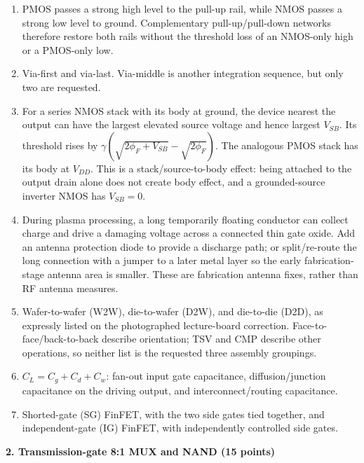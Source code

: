 \documentclass[10pt]{article}
\begin{document}
\begin{enumerate}[label=(\alph*),leftmargin=7mm,itemsep=6pt]
\item PMOS passes a strong high level to the pull-up rail, while NMOS passes a strong low level to ground. Complementary pull-up/pull-down networks therefore restore both rails without the threshold loss of an NMOS-only high or a PMOS-only low.
\item Via-first and via-last. Via-middle is another integration sequence, but only two are requested.
\item For a series NMOS stack with its body at ground, the device nearest the output can have the largest elevated source voltage and hence largest $V_{SB}$. Its threshold rises by $\gamma(\sqrt{2\phi_F+V_{SB}}-\sqrt{2\phi_F})$. The analogous PMOS stack has its body at $V_{DD}$. This is a stack/source-to-body effect: being attached to the output drain alone does not create body effect, and a grounded-source inverter NMOS has $V_{SB}=0$.
\item During plasma processing, a long temporarily floating conductor can collect charge and drive a damaging voltage across a connected thin gate oxide. Add an antenna protection diode to provide a discharge path; or split/re-route the long connection with a jumper to a later metal layer so the early fabrication-stage antenna area is smaller. These are fabrication antenna fixes, rather than RF antenna measures.
\item Wafer-to-wafer (W2W), die-to-wafer (D2W), and die-to-die (D2D), as expressly listed on the photographed lecture-board correction. Face-to-face/back-to-back describe orientation; TSV and CMP describe other operations, so neither list is the requested three assembly groupings.
\item $C_L=C_g+C_d+C_w$: fan-out input gate capacitance, diffusion/junction capacitance on the driving output, and interconnect/routing capacitance.
\item Shorted-gate (SG) FinFET, with the two side gates tied together, and independent-gate (IG) FinFET, with independently controlled side gates.
\end{enumerate}
\newpage
\textbf{2. Transmission-gate 8:1 MUX and NAND (15 points)}
\end{document}
